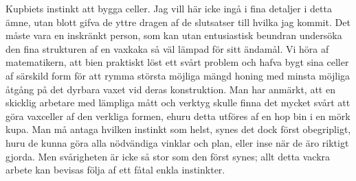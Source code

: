 Kupbiets instinkt att bygga celler. Jag vill här icke ingå i fina detaljer i detta ämne, utan blott gifva de yttre dragen af de slutsatser till hvilka jag kommit. Det måste vara en inskränkt person, som kan utan entusiastisk beundran undersöka den fina strukturen af en vaxkaka så väl lämpad för sitt ändamål. Vi höra af matematikern, att bien praktiskt löst ett svårt problem och hafva bygt sina celler af särskild form för att rymma största möjliga mängd honing med minsta möjliga åtgång på det dyrbara vaxet vid deras konstruktion. Man har anmärkt, att en skicklig arbetare med lämpliga mått och verktyg skulle finna det mycket svårt att göra vaxceller af den verkliga formen, ehuru detta utföres af en hop bin i en mörk kupa. Man må antaga hvilken instinkt som helst, synes det dock först obegripligt, huru de kunna göra alla nödvändiga vinklar och plan, eller inse när de äro riktigt gjorda. Men svårigheten är icke så stor som den först synes; allt detta vackra arbete kan bevisas följa af ett fåtal enkla instinkter.

